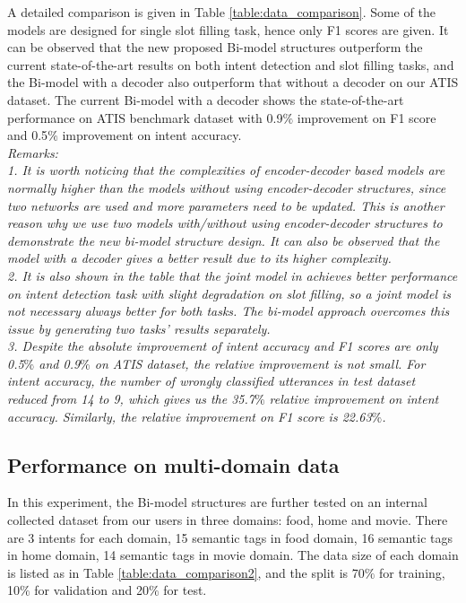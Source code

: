 \documentclass[11pt,a4paper]{article}
\begin{document}
A detailed comparison is given in Table \ref{table:data_comparison}. Some of the models are designed for single slot filling task, hence only F1 scores are given. It can be observed that the new proposed Bi-model structures outperform the current state-of-the-art results on both intent detection and slot filling tasks, and the Bi-model with a decoder also outperform that without a decoder on our ATIS dataset. The current Bi-model with a decoder shows the state-of-the-art performance on ATIS benchmark dataset with 0.9$\%$ improvement on F1 score and 0.5$\%$ improvement on intent accuracy.\\
{\it{Remarks:}\\
1.  It is worth noticing that the complexities of encoder-decoder based models are normally higher than the models without using encoder-decoder structures, since two networks are used and more parameters need to be updated. This is another reason why we use two models with/without using encoder-decoder structures to demonstrate the new bi-model structure design. It can also be observed that the model with a decoder gives a better result due to its higher complexity.\\
2. It is also shown in the table that the joint model in \cite{ liu2015recurrent, liu2016attention} achieves better performance on intent detection task with slight degradation on slot filling, so a joint model is not necessary always better for both tasks. The bi-model approach overcomes this issue by generating two tasks' results separately.\\
3. Despite the absolute improvement of intent accuracy and F1 scores are only  0.5$\%$ and 0.9$\%$ on ATIS dataset, the relative improvement is not small. For intent accuracy, the number of wrongly classified utterances in test dataset reduced from 14 to 9, which gives us the 35.7$\%$ relative improvement on intent accuracy. Similarly, the relative improvement on F1 score is 22.63$\%$.\\}



\subsection{Performance on multi-domain data}
In this experiment, the Bi-model structures are further tested on an internal collected dataset from our users in three domains: food, home and movie. There are 3 intents for each domain, 15 semantic tags in food domain, 16 semantic tags in home domain, 14 semantic tags in movie domain.  The data size of each domain is listed as in Table \ref{table:data_comparison2}, and the split is 70$\%$ for training, 10$\%$ for validation and 20$\%$ for test.
\end{document}
